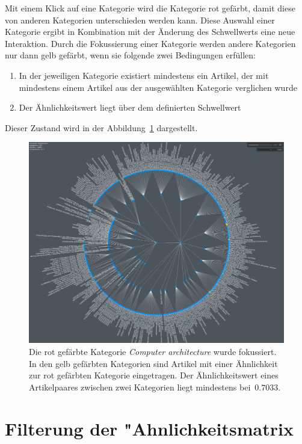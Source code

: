 Mit einem Klick auf eine Kategorie wird die Kategorie rot gefärbt, damit diese von anderen Kategorien unterschieden werden kann.
Diese Auswahl einer Kategorie ergibt in Kombination mit der Änderung des Schwellwerts eine neue Interaktion.
Durch die Fokussierung einer Kategorie werden andere Kategorien nur dann gelb gefärbt, wenn sie folgende zwei Bedingungen erfüllen:
\begin{enumerate}[label*=(\arabic*),leftmargin=1.5cm,series=example]
\item{In der jeweiligen Kategorie existiert mindestens ein Artikel, der mit mindestens einem Artikel aus der ausgewählten Kategorie verglichen wurde}
\item{Der Ähnlichkeitswert liegt über dem definierten Schwellwert}
\end{enumerate}
Dieser Zustand wird in der Abbildung~\ref{fig:threshold-focus-cat} dargestellt.

\begin{figure}[H]
    \centering
    \includegraphics[width=\textwidth]{images/filter-7033-focus}
    \caption{Die rot gefärbte Kategorie \emph{Computer architecture} wurde fokussiert. In den gelb gefärbten Kategorien sind Artikel mit einer Ähnlichkeit zur rot gefärbten Kategorie eingetragen. Der Ähnlichkeitswert eines Artikelpaares zwischen zwei Kategorien liegt mindestens bei~$0.7033$.}
    \label{fig:threshold-focus-cat}
\end{figure}


\section{Filterung der "Ahnlichkeitsmatrix} \label{subchap: filter-vis}

